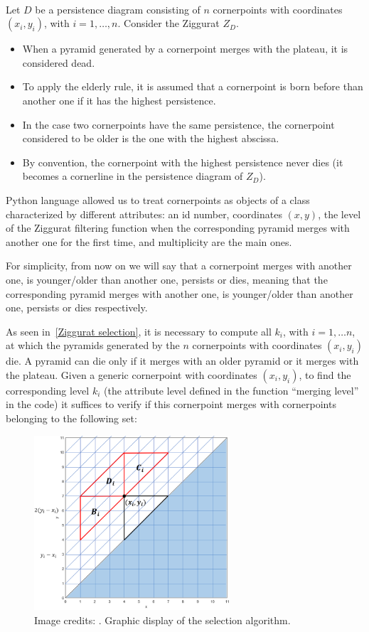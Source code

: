 \documentclass[english, LaM, oneside, noexaminfo]{sapthesis}
\begin{document}
\

Let $D$ be a persistence diagram consisting of $n$ cornerpoints with coordinates $(x_i, y_i)$, with $i = 1, \dots, n$. Consider the Ziggurat $Z_D$.
\begin{itemize}
    \item When a pyramid generated by a cornerpoint merges with the plateau, it is considered dead.
    \item To apply the elderly rule, it is assumed that a  cornerpoint is born before than another one if it has the highest persistence.
    \item In the case two cornerpoints have the same persistence, the cornerpoint considered to be older is the one with the highest abscissa. 
    \item By convention, the cornerpoint with the highest persistence never dies (it becomes a cornerline in the persistence diagram of $Z_D$).
\end{itemize}

Python language allowed us to treat cornerpoints as objects of a class characterized by different attributes: an id number, coordinates $(x, y)$, the level of the Ziggurat filtering function when the corresponding pyramid merges with another one for the first time, and multiplicity are the main ones. 

For simplicity, from now on we will say that a cornerpoint merges with another one, is younger/older than another one, persists or dies, meaning that the corresponding pyramid merges with another one, is younger/older than another one, persists or dies respectively.

As seen in~\cref{Ziggurat selection}, it is necessary to compute all $k_i$, with $i = 1, \dots n$, at which
the pyramids generated by the $n$ cornerpoints with coordinates $(x_i, y_i)$ die. 
A pyramid can die only if it merges with an older pyramid
or it merges with the plateau. Given a generic cornerpoint with coordinates $(x_i, y_i)$, to find the corresponding level $k_i$ (the attribute level defined in the function ``merging level'' in the code) it suffices to verify if this cornerpoint merges with  cornerpoints belonging to the following set:

\begin{figure}
\centering
\includegraphics[height=6.5cm]{Ziggurat algorithm.png}
\caption{Image credits: \cite{student01_my_bachel}. Graphic display of the selection algorithm.}\label{fig:Ziggurat algorithm}
\end{figure}
\end{document}
